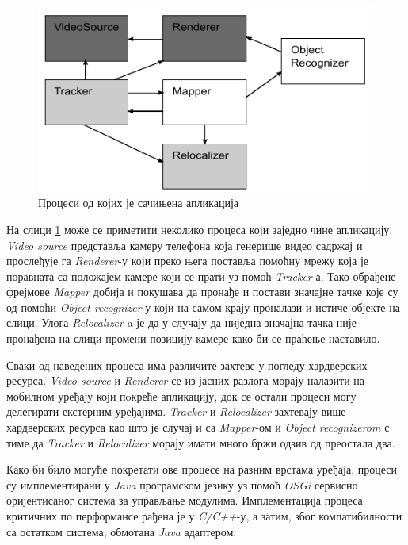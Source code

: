 \begin{figure}[H]
    \centering
    \includegraphics[width=1\textwidth]{images/ar_processes.png}
    \caption{Процеси од којих је сачињена апликација}
    \label{fig:ar_processes}
\end{figure}

На слици \ref{fig:ar_processes} може се приметити неколико процеса који заједно чине апликацију. \textit{Video source} представља камеру телефона која генерише видео садржај и прослеђује га \textit{Renderer}-у који преко њега поставља помоћну мрежу која је поравната са положајем камере који се прати уз помоћ \textit{Tracker}-а. Тако обрађене фрејмове \textit{Mapper} добија и покушава да пронађе и постави значајне тачке које су од помоћи \textit{Object recognizer}-у који на самом крају проналази и истиче објекте на слици. Улога \textit{Relocalizer}-a је да у случају да ниједна значајна тачка није пронађена на слици промени позицију камере како би се праћење наставило.


Сваки од наведених процеса има различите захтеве у погледу хардверских ресурса. \textit{Video source} и \textit{Renderer} се из јасних разлога морају налазити на мобилном уређају који пoкреће апликацију, док се остали процеси могу делегирати екстерним уређајима. \textit{Tracker} и \textit{Relocalizer} захтевају више хардверских ресурса као што је случај и са \textit{Mapper}-ом и \textit{Object recognizerom} с тиме да \textit{Tracker} и \textit{Relocalizer} морају имати много бржи одзив од преостала два. 


Како би било могуће покретати ове процесе на разним врстама уређаја, процеси су имплементирани у \textit{Java} програмском језику уз помоћ \textit{OSGi} сервисно оријентисаног система за управљање модулима. Имплементација процеса критичних по перформансе рађена је у \textit{C/C++}-у, а затим, због компатибилности са остатком система, обмотана \textit{Java} адаптером.

